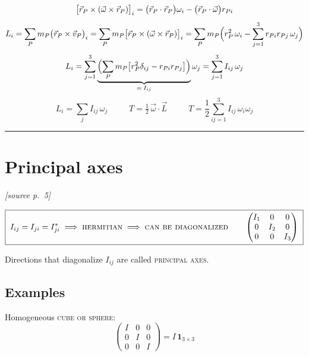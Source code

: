 \documentclass[11pt]{article}
\newcommand{\src}[1]{\par\nobreak\vspace{-4pt}\hfill{\footnotesize\itshape[source p.~#1]}\par\nobreak\vspace{2pt}}
\begin{document}
\begin{gather*}
\bigl[\vec{r}_P\times(\vec{\omega}\times\vec{r}_P)\bigr]_i
= \bigl(\vec{r}_P\cdot\vec{r}_P\bigr)\omega_i - \bigl(\vec{r}_P\cdot\vec{\omega}\bigr) r_{Pi}\\[4pt]
L_i = \sum_P m_P\bigl(\vec{r}_P\times\vec{v}_P\bigr)_i
= \sum_P m_P\bigl[\vec{r}_P\times(\vec{\omega}\times\vec{r}_P)\bigr]_i
= \sum_P m_P\Bigl(r_P^{2}\,\omega_i - \sum_{j=1}^{3} r_{Pi} r_{Pj}\,\omega_j\Bigr)\\[4pt]
L_i = \sum_{j=1}^{3}\underbrace{\Bigl(\sum_P m_P\bigl[r_P^{2}\delta_{ij}-r_{Pi}r_{Pj}\bigr]\Bigr)}_{=\;I_{ij}}\omega_j
= \sum_{j=1}^{3} I_{ij}\,\omega_j
\end{gather*}
\begin{equation*}
\boxed{\;L_i = \sum_j I_{ij}\,\omega_j\;}
\qquad
\boxed{\;T = \tfrac{1}{2}\,\vec{\omega}\cdot\vec{L}\;}
\qquad
\boxed{\;T = \frac{1}{2}\sum_{ij=1}^{3} I_{ij}\,\omega_i\omega_j\;}
\end{equation*}

\bigskip\hrule\bigskip

\section*{Principal axes}
\src{5}

\begin{equation*}
\boxed{\;
I_{ij} = I_{ji} = I^{*}_{ji} \;\Longrightarrow\; \text{\textsc{hermitian}}
\;\Longrightarrow\; \text{\textsc{can be diagonalized}}
\qquad
\begin{pmatrix} I_1 & 0 & 0\\ 0 & I_2 & 0\\ 0 & 0 & I_3\end{pmatrix}\;}
\end{equation*}

Directions that diagonalize $I_{ij}$ are called \textsc{principal axes}.

\subsection*{Examples}

Homogeneous \textsc{cube or sphere}:
\begin{equation*}
\begin{pmatrix} I & 0 & 0\\ 0 & I & 0\\ 0 & 0 & I\end{pmatrix} = I\,\mathbf{1}_{3\times3}
\end{equation*}
\end{document}

